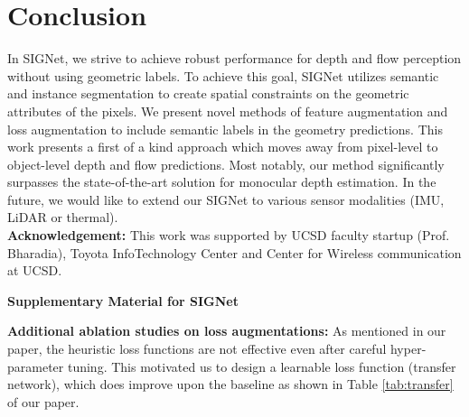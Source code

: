 \documentclass[10pt,twocolumn]{article}
\newcommand{\Noindent}{\vspace{2pt} \noindent}
\newcommand{\partitle}[1]{\Noindent\textbf{#1: }}
\newcommand{\name}{SIGNet\xspace}
\begin{document}
\section{Conclusion}
\label{sec:conclusion}
In \name, we strive to achieve robust performance for depth and flow perception without using geometric labels. To achieve this goal, \name utilizes semantic and instance segmentation to create spatial constraints on the geometric attributes of the pixels. We present novel methods of feature augmentation and loss augmentation to include semantic labels in the geometry predictions. This work presents a first of a kind approach which moves away from pixel-level to object-level depth and flow predictions. Most notably, our method significantly surpasses the state-of-the-art solution for monocular depth estimation. In the future, we would like to extend our \name to various sensor modalities (IMU, LiDAR or thermal).\\

\partitle{Acknowledgement}This work was supported by UCSD faculty startup (Prof. Bharadia), Toyota InfoTechnology Center and Center for Wireless communication at UCSD. 
\FloatBarrier
\twocolumn
{\small


}

\newpage
\newpage
\onecolumn
\setcounter{section}{0}
\setcounter{figure}{0}
\setcounter{table}{0}
\renewcommand\thesection{\Alph{section}}
\renewcommand\thesubsection{\Alph{subsection}}

\newcommand{\TODO}[1]{\textbf{\textcolor{red}{(: #1)}}}
\newcommand{\CAPOUR}{\noindent Top to bottom: input image, semantic segmentation, instance segmentation, ground truth disparity map, disparity prediction from baseline(Yin \textit{et al}. \cite{yin2018geonet}) , disparity prediction from ours, AbsRel error map of baseline models, AbsRel error map of ours and the improvement region compared to baseline. For the purpose of visualization, disparity maps are interpolated and cropped\cite{Garg2016UnsupervisedCF}. For all heatmaps, darker means smaller value (disparity, error or improvement). Typical image regions where we do better include cars, pedestrians and other common dynamic objects}

\newcommand{\GAP}{\quad}

{\Large\noindent  \textbf{Supplementary Material for \name}\vspace{8pt}}


\noindent \textbf{Additional ablation studies on loss augmentations:} As mentioned in our paper, the heuristic loss functions are not effective even after careful hyper-parameter tuning. This motivated us to design a learnable loss function (transfer network), which does improve upon the baseline as shown in Table \ref{tab:transfer} of our paper.
\end{document}
